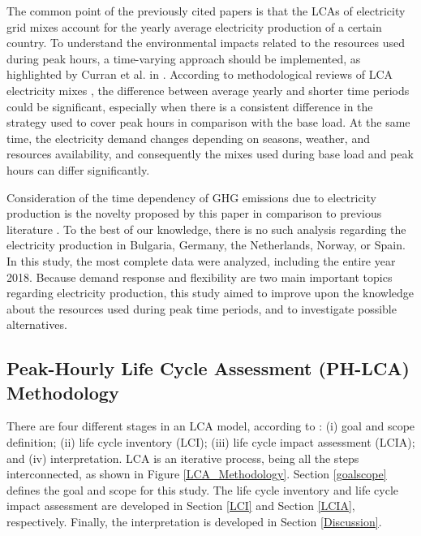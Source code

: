 {{The common point of the previously cited papers is that the LCAs of electricity grid mixes account for the yearly average electricity production of a certain country. To understand  the environmental impacts related to the resources used during peak hours, a time-varying approach should be implemented, as highlighted by Curran et al. in \cite{CURRAN2005}.} 
{According to methodological reviews of LCA electricity mixes \cite{Soimakallio2011,Turconi2013LifeLimitations}, the difference between average yearly and shorter time periods could be significant, especially when there is a consistent difference in the strategy used to cover peak hours in comparison with the base load. At the same time, the electricity demand changes depending on seasons, weather, and resources availability, and consequently the mixes used  during base load and peak hours can differ significantly.}

{Consideration of the time dependency of GHG emissions due to electricity production is the novelty proposed by this paper in comparison to previous literature \cite{Garcia-Gusano2017, Lund2010EnergyLCA, Jones2017AnGeneration, Thomson2017MarginalBritain, Howard2017CurrentCity, Garcia2014, Garcia2016MarginalVehicles, Moro2017}}. To the best of our knowledge, there is no such analysis regarding the electricity production in Bulgaria, Germany, the Netherlands, Norway, or Spain. In this study, the most complete data were analyzed, including the entire year 2018. Because demand response and flexibility are two main important topics regarding electricity production, this study aimed to improve upon the knowledge about the resources used during peak time periods, and to investigate possible alternatives. 

\subsection{Peak-Hourly Life Cycle Assessment (PH-LCA) Methodology}


{There are four different stages in an LCA model, according to \cite{2006ISOGuidelines, 2006ISOFramework}: (i) goal and scope definition; (ii) life cycle inventory (LCI); (iii) life cycle impact assessment (LCIA); and (iv) interpretation. LCA is an iterative process, being all the steps interconnected, as shown in Figure \ref{LCA_Methodology}.}
{Section \ref{goalscope} defines the goal and scope for this study.} The life cycle inventory and life cycle impact assessment are developed in Section \ref{LCI} and Section \ref{LCIA}, respectively. {Finally, the interpretation is developed in Section \ref{Discussion}}.

}
